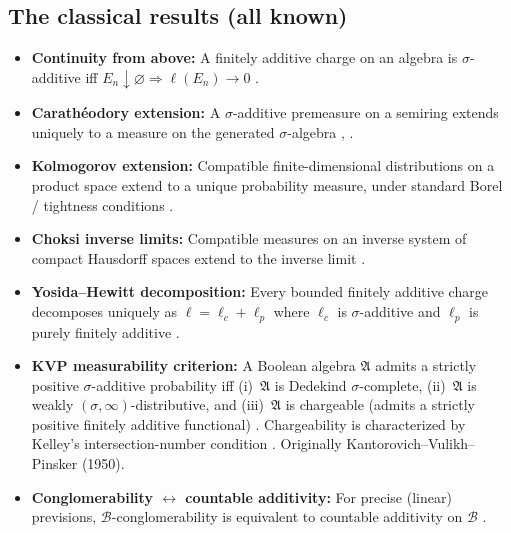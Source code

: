 \subsection{The classical results (all known)}

\begin{itemize}
  \item \textbf{Continuity from above:} A finitely additive charge
    on an algebra is $\sigma$-additive iff
    $E_n \downarrow \varnothing \Rightarrow \ell(E_n) \to 0$
    \cite[\S13, Theorem~D]{Halmos1950}.

  \item \textbf{Carath\'{e}odory extension:} A $\sigma$-additive
    premeasure on a semiring extends uniquely to a measure on the
    generated $\sigma$-algebra
    \cite[\S13]{Halmos1950}, \cite[Vol.~1, Ch.~1]{Bogachev2007}.

  \item \textbf{Kolmogorov extension:} Compatible
    finite-dimensional distributions on a product space extend to a
    unique probability measure, under standard Borel / tightness
    conditions \cite[Ch.~36]{Billingsley1995}.

  \item \textbf{Choksi inverse limits:} Compatible measures on an
    inverse system of compact Hausdorff spaces extend to the
    inverse limit \cite[Theorem~1]{Choksi1958}.

  \item \textbf{Yosida--Hewitt decomposition:} Every bounded
    finitely additive charge decomposes uniquely as
    $\ell = \ell_c + \ell_p$ where $\ell_c$ is $\sigma$-additive
    and $\ell_p$ is purely finitely additive
    \cite{YosidaHewitt1952}.

  \item \textbf{KVP measurability criterion:} A Boolean algebra
    $\mathfrak{A}$ admits a strictly positive $\sigma$-additive
    probability iff (i)~$\mathfrak{A}$ is Dedekind
    $\sigma$-complete, (ii)~$\mathfrak{A}$ is weakly
    $(\sigma,\infty)$-distributive, and (iii)~$\mathfrak{A}$ is
    chargeable (admits a strictly positive finitely additive
    functional) \cite[391D]{Fremlin2003}.  Chargeability is
    characterized by Kelley's intersection-number condition
    \cite[391J]{Fremlin2003}.  Originally
    Kantorovich--Vulikh--Pinsker (1950).

  \item \textbf{Conglomerability $\leftrightarrow$ countable
    additivity:} For precise (linear) previsions,
    $\mathcal{B}$-conglomerability is equivalent to countable
    additivity on $\mathcal{B}$
    \cite{Seidenfeld1984}.
\end{itemize}

